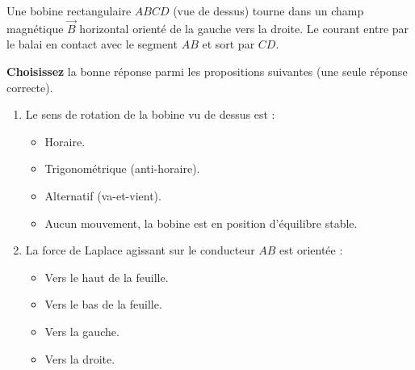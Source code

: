 \documentclass[11pt]{article}
\begin{document}
\begin{exercice}
Une bobine rectangulaire $ABCD$ (vue de dessus) tourne dans un champ magnétique $\vec{B}$ horizontal orienté de la gauche vers la droite. Le courant entre par le balai en contact avec le segment $AB$ et sort par $CD$.
\begin{center}
\end{center}
\textbf{Choisissez} la bonne réponse parmi les propositions suivantes (une seule réponse correcte).
\begin{enumerate}
    \item Le sens de rotation de la bobine vu de dessus est :
    \begin{itemize}
        \item[A.] Horaire.
        \item[B.] Trigonométrique (anti-horaire).
        \item[C.] Alternatif (va-et-vient).
        \item[D.] Aucun mouvement, la bobine est en position d'équilibre stable.
    \end{itemize}
    \item La force de Laplace agissant sur le conducteur $AB$ est orientée :
    \begin{itemize}
        \item[A.] Vers le haut de la feuille.
        \item[B.] Vers le bas de la feuille.
        \item[C.] Vers la gauche.
        \item[D.] Vers la droite.
    \end{itemize}
\end{enumerate}
\end{exercice}
\end{document}
